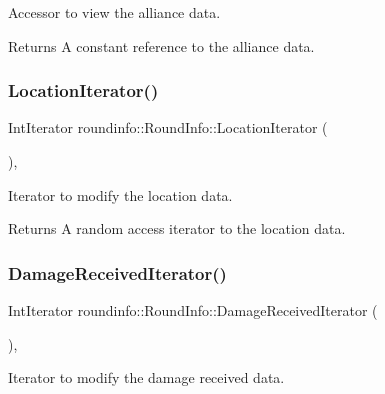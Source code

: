 Accessor to view the alliance data. 

\begin{DoxyReturn}{Returns}
A constant reference to the alliance data. 
\end{DoxyReturn}
\mbox{\label{classroundinfo_1_1_round_info_ab9e17ca5d68f9981862cbf540cc0b297}} 
\subsubsection{\texorpdfstring{Location\+Iterator()}{LocationIterator()}}
{\footnotesize\ttfamily Int\+Iterator roundinfo\+::\+Round\+Info\+::\+Location\+Iterator (\begin{DoxyParamCaption}{ }\end{DoxyParamCaption})\hspace{0.3cm}{\ttfamily [inline]}, {\ttfamily [noexcept]}}



Iterator to modify the location data. 

\begin{DoxyReturn}{Returns}
A random access iterator to the location data. 
\end{DoxyReturn}
\mbox{\label{classroundinfo_1_1_round_info_a94ea1a09ae7680e74188296aef0b0d63}} 
\subsubsection{\texorpdfstring{Damage\+Received\+Iterator()}{DamageReceivedIterator()}}
{\footnotesize\ttfamily Int\+Iterator roundinfo\+::\+Round\+Info\+::\+Damage\+Received\+Iterator (\begin{DoxyParamCaption}{ }\end{DoxyParamCaption})\hspace{0.3cm}{\ttfamily [inline]}, {\ttfamily [noexcept]}}



Iterator to modify the damage received data. 

